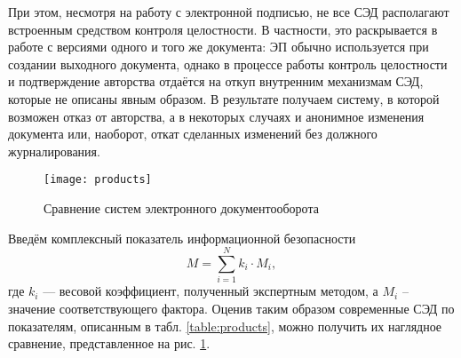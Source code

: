 При этом, несмотря на работу с электронной подписью, не все СЭД располагают встроенным средством контроля целостности. В частности, это раскрывается в работе с версиями одного и того же документа: ЭП обычно используется при создании выходного документа, однако в процессе работы контроль целостности и подтверждение авторства отдаётся на откуп внутренним механизмам СЭД, которые не описаны явным образом. В результате получаем систему, в которой возможен отказ от авторства, а в некоторых случаях и анонимное изменения документа или, наоборот, откат сделанных изменений без должного журналирования.

\begin{figure}[h!]
  \centering
  \texttt{[image: products]}
  \caption{Сравнение систем электронного документооборота}
  \label{img:products}
\end{figure}
\vspace{\baselineskip}
Введём комплексный показатель информационной безопасности
$$
M = \sum_{i=1}^N k_i \cdot M_i,
$$
где $k_i$ --- весовой коэффициент, полученный экспертным методом, а $M_i$ -- значение соответствующего фактора.
Оценив таким образом современные СЭД по показателям, описанным в табл. \ref{table:products}, можно получить их наглядное сравнение, представленное на рис. \ref{img:products}.

